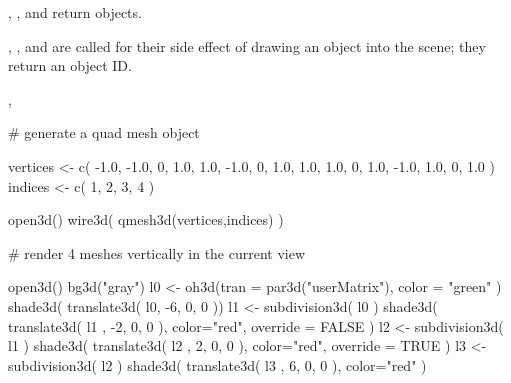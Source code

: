 \documentclass{article}
\begin{document}
\begin{Value}
, , and  return  objects.

, , and  are called for their side effect
of drawing an object into the scene; they return an object ID.
\end{Value}
\begin{SeeAlso}\relax
{}, 
\end{SeeAlso}
\begin{Examples}
\begin{ExampleCode}

  # generate a quad mesh object

  vertices <- c( 
     -1.0, -1.0, 0, 1.0,
      1.0, -1.0, 0, 1.0,
      1.0,  1.0, 0, 1.0,
     -1.0,  1.0, 0, 1.0
  )
  indices <- c( 1, 2, 3, 4 )
  
  open3d()  
  wire3d( qmesh3d(vertices,indices) )
  
  # render 4 meshes vertically in the current view

  open3d()  
  bg3d("gray")
  l0 <- oh3d(tran = par3d("userMatrix"), color = "green" )
  shade3d( translate3d( l0, -6, 0, 0 ))
  l1 <- subdivision3d( l0 )
  shade3d( translate3d( l1 , -2, 0, 0 ), color="red", override = FALSE )
  l2 <- subdivision3d( l1 )
  shade3d( translate3d( l2 , 2, 0, 0 ), color="red", override = TRUE )
  l3 <- subdivision3d( l2 )
  shade3d( translate3d( l3 , 6, 0, 0 ), color="red" )
  
\end{ExampleCode}
\end{Examples}
\end{document}
